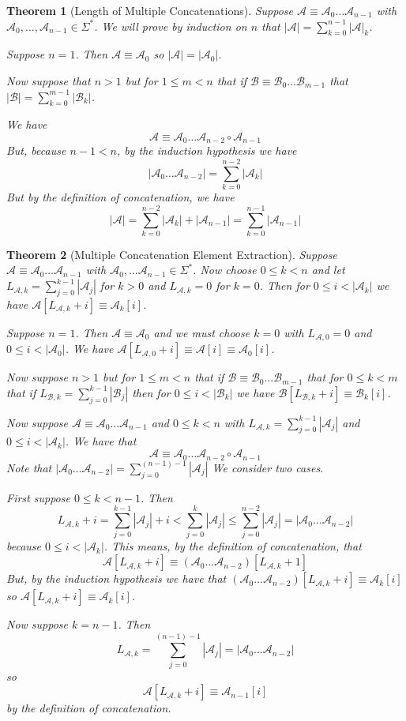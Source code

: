 \documentclass[12pt]{article}
\theoremstyle{break}
\theoremstyle{break}
\newtheorem{theorem}{Theorem}[section]
\theoremstyle{break}
\theoremstyle{break}
\theoremstyle{break}
\newtheorem{informal definition}[definition]{Informal Definition}
\newcommand{\mc}[1]{\mathcal{#1}}
\begin{document}
\begin{theorem}[Length of Multiple Concatenations]
\label{thm:list:lenmultconcat}
Suppose $\mc{A} \equiv \mc{A}_0 \ldots \mc{A}_{n-1}$ with $\mc{A}_0,\ldots,\mc{A}_{n-1}\in\Sigma^*$.
We will prove by induction on $n$ that $|\mc{A}| = \sum_{k=0}^{n-1} |\mc{A}|_k$.

Suppose $n=1$.
Then $\mc{A} \equiv \mc{A}_0$ so $|\mc{A}| = |\mc{A}_0|$.

Now suppose that $n>1$ but for $1\le m < n$ that if $\mc{B} \equiv \mc{B}_0\ldots\mc{B}_{m-1}$ that $|\mc{B}| = \sum_{k=0}^{m-1} |\mc{B}_k|$.

We have
$$
\mc{A} \equiv \mc{A}_0 \ldots \mc{A}_{n-2} \circ \mc{A}_{n-1}
$$
But, because $n-1<n$, by the induction hypothesis we have
$$
|\mc{A}_0\ldots\mc{A}_{n-2}| = \sum_{k=0}^{n-2} |\mc{A}_k|
$$
But by the definition of concatenation, we have
$$
|\mc{A}| = \sum_{k=0}^{n-2} |\mc{A}_k| + |\mc{A}_{n-1}| = \sum_{k=0}^{n-1}|\mc{A}_{n-1}|
$$
\end{theorem}

\begin{theorem}[Multiple Concatenation Element Extraction]
\label{thm:list:multconcatextract}
Suppose $\mc{A} \equiv \mc{A}_0\ldots\mc{A}_{n-1}$ with $\mc{A}_0,\ldots \mc{A}_{n-1}\in\Sigma^*$.
Now choose $0\le k < n$ and let $L_{\mc{A},k} = \sum_{j=0}^{k-1} |\mc{A}_j|$ for $k>0$ and $L_{\mc{A},k}=0$ for $k=0$.
Then for $0\le i < |\mc{A}_k|$ we have $\mc{A}[L_{\mc{A},k}+i] \equiv \mc{A}_k[i]$.

Suppose $n=1$.
Then $\mc{A} \equiv \mc{A}_0$ and we must choose $k=0$ with $L_{\mc{A},0}=0$ and $0 \le i < |\mc{A}_0|$.
We have $\mc{A}[L_{\mc{A},0}+i] \equiv \mc{A}[i] \equiv \mc{A}_0[i]$.

Now suppose $n>1$ but for $1\le m < n$ that if $\mc{B}\equiv \mc{B}_0\ldots\mc{B}_{m-1}$ that for $0\le k < m$ that if $L_{\mc{B},k} = \sum_{j=0}^{k-1} |\mc{B}_j|$ then for $0\le i < |\mc{B}_k|$ we have $\mc{B}[L_{\mc{B},k} + i] \equiv \mc{B}_k[i]$.

Now suppose $\mc{A}\equiv \mc{A}_0\ldots \mc{A}_{n-1}$ and $0\le k < n$ with $L_{\mc{A},k} = \sum_{j=0}^{k-1}|\mc{A}_j|$ and $0\le i < |\mc{A}_k|$.
We have that
$$
\mc{A}\equiv \mc{A}_0\ldots \mc{A}_{n-2} \circ \mc{A}_{n-1}
$$
Note that $|\mc{A}_0\ldots\mc{A}_{n-2}| = \sum_{j=0}^{(n-1)-1} |\mc{A}_j|$
We consider two cases.

First suppose $0\le k < n-1$.
Then
$$
L_{\mc{A},k} + i = \sum_{j=0}^{k-1}|\mc{A}_j| + i < \sum_{j=0}^k |\mc{A}_j| \le \sum_{j=0}^{n-2}|\mc{A}_j| = |\mc{A}_0\ldots\mc{A}_{n-2}|
$$
because $0\le i < |\mc{A}_k|$.
This means, by the definition of concatenation, that
$$
\mc{A}[L_{\mc{A},k}+i] \equiv (\mc{A}_0\ldots\mc{A}_{n-2})[L_{\mc{A}, k}+1]
$$
But, by the induction hypothesis we have that $(\mc{A}_0\ldots\mc{A}_{n-2})[L_{\mc{A},k}+i] \equiv \mc{A}_k[i]$ so
$\mc{A}[L_{\mc{A},k}+i] \equiv \mc{A}_k[i]$.

Now suppose $k=n-1$.
Then
$$
L_{\mc{A},k} = \sum_{j=0}^{(n-1)-1}|\mc{A}_j| = |\mc{A}_0\ldots \mc{A}_{n-2}|
$$
so
$$
\mc{A}[L_{\mc{A},k} +i] \equiv \mc{A}_{n-1}[i]
$$
by the definition of concatenation.
\end{theorem}
\end{document}
